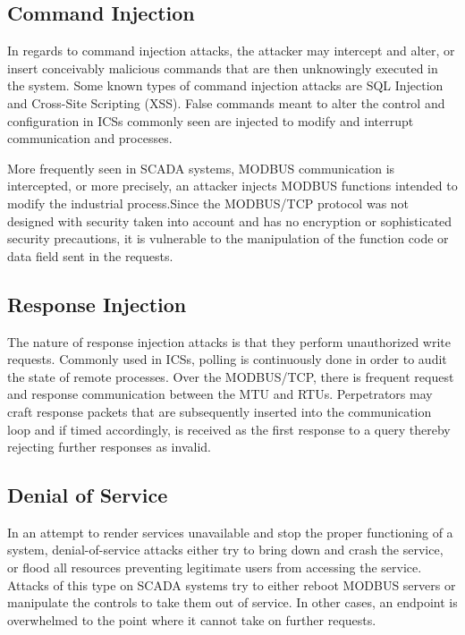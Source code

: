 \documentclass[12pt,]{article}
\begin{document}
\subsection{Command Injection}\label{command-injection}

In regards to command injection attacks, the attacker may intercept and
alter, or insert conceivably malicious commands that are then
unknowingly executed in the system. Some known types of command
injection attacks are SQL Injection and Cross-Site Scripting (XSS).
False commands meant to alter the control and configuration in ICSs
commonly seen are injected to modify and interrupt communication and
processes.

More frequently seen in SCADA systems, MODBUS communication is
intercepted, or more precisely, an attacker injects MODBUS functions
intended to modify the industrial process.Since the MODBUS/TCP protocol
was not designed with security taken into account and has no encryption
or sophisticated security precautions, it is vulnerable to the
manipulation of the function code or data field sent in the requests.

\subsection{Response Injection}\label{response-injection}

The nature of response injection attacks is that they perform
unauthorized write requests. Commonly used in ICSs, polling is
continuously done in order to audit the state of remote processes. Over
the MODBUS/TCP, there is frequent request and response communication
between the MTU and RTUs. Perpetrators may craft response packets that
are subsequently inserted into the communication loop and if timed
accordingly, is received as the first response to a query thereby
rejecting further responses as invalid.

\subsection{Denial of Service}\label{denial-of-service}

In an attempt to render services unavailable and stop the proper
functioning of a system, denial-of-service attacks either try to bring
down and crash the service, or flood all resources preventing legitimate
users from accessing the service. Attacks of this type on SCADA systems
try to either reboot MODBUS servers or manipulate the controls to take
them out of service. In other cases, an endpoint is overwhelmed to the
point where it cannot take on further requests.
\end{document}
